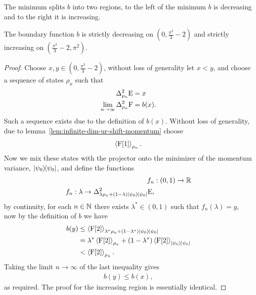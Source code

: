 The minimum splits $b$ into two regions, to the left of the minimum $b$ is decreasing and to the right it is increasing.
\begin{lem}\label{lem:box-ur-fn-dec-inc}
  The boundary function $b$ is strictly decreasing on $\left(0, \frac{\pi^2}{3}-2\right)$ and strictly increasing on $\left(\frac{\pi^2}{3}-2, \pi^2\right)$.
\end{lem}
\begin{proof}
  Choose $x,y \in \left(0,\frac{\pi^2}{3}-2\right)$, without loss of generality let $x < y$, and choose a sequence of states $\rho_n$ such that
  \begin{align}%
    \var[\rho_n]{\ope} &= x\\
    \lim_{n\to\infty}\var[\rho_n]{\opf} &=b(x).
  \end{align}
  Such a sequence exists due to the definition of $b(x)$. Without loss of generality, due to lemma~\ref{lem:infinite-dim-ur-shift-momentum} choose
  \begin{align}
    \left\langle{\operatorname{F}[1]}\right\rangle_{\rho_n}.
  \end{align}
  Now we mix these states with the projector onto the minimizer of the momentum variance, $|\psi_0\rangle\!\langle\psi_0|$, and define the functions
  \begin{align}
    f_n&:(0,1) \to \R\\
    f_n:\lambda \to \var[\lambda\rho_n+(1-\lambda)\ketbra{\psi_0}{\psi_0}]{\ope},
  \end{align}
  by continuity, for each $n\in\mathbb{N}$ there exists $\lambda^*\in (0,1)$ such that $f_n(\lambda) = y$, now by the definition of $b$ we have
  \begin{align}
    b(y) &\leq \left\langle{\operatorname{F}[2]}\right\rangle_{\lambda^*\rho_n+(1-\lambda^*)|\psi_0\rangle\!\langle\psi_0|}\\
         &= \lambda^*\left\langle{\operatorname{F}[2]}\right\rangle_{\rho_n}+(1-\lambda^*)\left\langle{\operatorname{F}[2]}\right\rangle_{|\psi_0\rangle\!\langle\psi_0|}\\
         &< \left\langle{\operatorname{F}[2]}\right\rangle_{\rho_n}.
  \end{align}
  Taking the limit $n\to\infty$ of the last inequality gives
  \begin{align}
    b(y) \leq b(x),
  \end{align}
  as required. The proof for the increasing region is essentially identical.
\end{proof}

